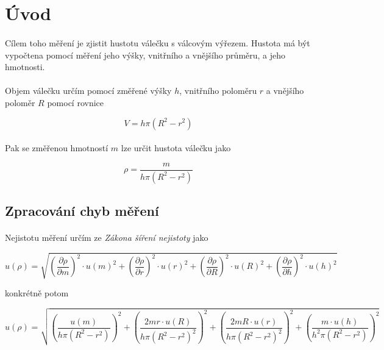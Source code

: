 \documentclass[a4paper,11pt]{article}
\begin{document}
\section{Úvod}

    \paragraph{} Cílem toho měření je zjistit hustotu válečku s válcovým výřezem. 
    Hustota má být vypočtena pomocí měření jeho výšky, vnitřního a vnějšího průměru, a
    jeho hmotnosti.

    \paragraph{} Objem válečku určím pomocí změřené výšky $h$, vnitřního poloměru $r$ a
    vnějšího poloměr $R$ pomocí rovnice

    $$V = h \pi (R^{2} - r^{2})$$

    \paragraph{} Pak se změřenou hmotností $m$ lze určit hustota válečku jako

    $$\rho = \frac{m}{h \pi (R^{2} - r^{2})}$$

    \subsection{Zpracování chyb měření}

        \paragraph{} Nejistotu měření určím ze \textit{Zákona šíření nejistoty} jako

        $$u(\rho) = \sqrt{
          \left(\frac{\partial \rho}{\partial m}\right)^{2} \cdot u(m)^{2}
        + \left(\frac{\partial \rho}{\partial r}\right)^{2} \cdot u(r)^{2} 
        + \left(\frac{\partial \rho}{\partial R}\right)^{2} \cdot u(R)^{2}
        + \left(\frac{\partial \rho}{\partial h}\right)^{2} \cdot u(h)^{2}
        }$$

        konkrétně potom

        $$u(\rho) = \sqrt{
              \left(\frac{u(m)}{h \pi \left(R^{2} - r^{2}\right)}\right)^{2}
            + \left(\frac{2mr \cdot u(R)}{h \pi \left(R^{2} - r^{2}\right)^{2}}\right)^{2}
            + \left(\frac{2mR \cdot u(r)}{h \pi \left(R^{2} - r^{2}\right)^{2}}\right)^{2}
            + \left(\frac{m \cdot u(h)}{h^{2} \pi \left(R^{2} - r^{2}\right)}\right)^{2}
        }$$
\end{document}
